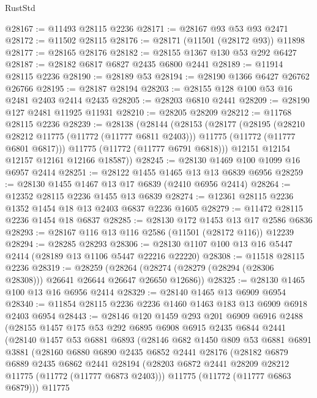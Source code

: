 \begin{lexlean}{RustStd}
\begin{coremodule}
@28167 := @11493 @28115 @2236
@28171 := @28167 @93 @53 @93 @2471
@28172 := @11502 @28115
@28176 := @28171 (@11501 (@28172 @93)) @11898
@28177 := @28165 @28176
@28182 := @28155 @1367 @130 @53 @292 @6427
@28187 := @28182 @6817 @6827 @2435 @6800 @2441
@28189 := @11914 @28115 @2236
@28190 := @28189 @53
@28194 := @28190 @1366 @6427 @26762 @26766
@28195 := @28187 @28194
@28203 := @28155 @128 @100 @53 @16 @2481 @2403 @2414 @2435
@28205 := @28203 @6810 @2441
@28209 := @28190 @127 @2481 @11925 @11931
@28210 := @28205 @28209
@28212 := @11768 @28115 @2236
@28239 := @28138
    (@28144
      (@28153
        (@28177
          (@28195
            (@28210 @28212 @11775 (@11772 (@11777 @6811 @2403)))
            @11775
            (@11772 (@11777 @6801 @6817)))
          @11775
          (@11772 (@11777 @6791 @6818)))
        @12151
        @12154
        @12157
        @12161
        @12166
        @18587))
@28245 := @28130 @1469 @100 @1099 @16 @6957 @2414
@28251 := @28122 @1455 @1465 @13 @13 @6839 @6956
@28259 := @28130 @1455 @1467 @13 @17 @6839 (@2410 @6956 @2414)
@28264 := @12352 @28115 @2236 @1455 @13 @6839
@28274 := @12361 @28115 @2236 @1352 @1454 @18 @13 @2403 @6837 @2236 @1605
@28279 := @11472 @28115 @2236 @1454 @18 @6837
@28285 := @28130 @172 @1453 @13 @17 @2586 @6836
@28293 := @28167 @116 @13 @116 @2586 (@11501 (@28172 @116)) @12239
@28294 := @28285 @28293
@28306 := @28130 @1107 @100 @13 @16 @5447 @2414 (@28189 @13 @1106 @5447 @22216 @22220)
@28308 := @11518 @28115 @2236
@28319 := @28259
    (@28264 (@28274 (@28279 (@28294 (@28306 @28308))) @26641 @26644 @26647 @26650 @12686))
@28325 := @28130 @1465 @100 @13 @16 @6956 @2414
@28329 := @28140 @1465 @13 @6909 @6954
@28340 := @11854 @28115 @2236 @2236 @1460 @1463 @183 @13 @6909 @6918 @2403 @6954
@28443 := @28146
    @120
    @1459
    @293
    @201
    @6909
    @6916
    @2488
    (@28155
      @1457
      @175
      @53
      @292
      @6895
      @6908
      @6915
      @2435
      @6844
      @2441
      (@28140
        @1457
        @53
        @6881
        @6893
        (@28146
          @682
          @1450
          @809
          @53
          @6881
          @6891
          @3881
          (@28160
            @6880
            @6890
            @2435
            @6852
            @2441
            @28176
            (@28182
              @6879
              @6889
              @2435
              @6862
              @2441
              @28194
              (@28203 @6872 @2441 @28209 @28212 @11775 (@11772 (@11777 @6873 @2403)))
              @11775
              (@11772 (@11777 @6863 @6879)))
            @11775

\end{coremodule}
\end{lexlean}

